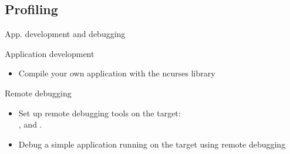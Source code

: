 \subsection{Profiling}





\setuplabframe
{App. development and debugging}
{
  Application development
  \begin{itemize}
  \item Compile your own application with the ncurses library
  \end{itemize}
  Remote debugging
  \begin{itemize}
  \item Set up remote debugging tools on the target:\\
        ,  and .
  \item Debug a simple application running on the target using remote
    debugging
  \end{itemize}
}

